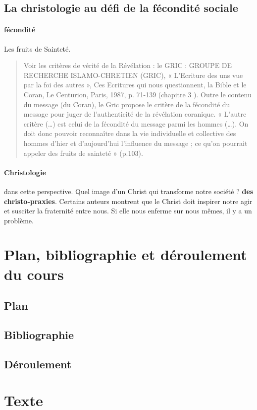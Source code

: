 \subsection{La christologie au défi de la fécondité sociale} 


\paragraph{fécondité} Les fruits de Sainteté. 
\begin{quote}
    Voir les critères de vérité de la Révélation : le GRIC : GROUPE DE RECHERCHE
ISLAMO-CHRETIEN (GRIC), « L’Ecriture des uns vue par la foi des autres », Ces Ecritures
qui nous questionnent, la Bible et le Coran, Le Centurion, Paris, 1987, p. 71-139 (chapitre 3 ).
Outre le contenu du message (du Coran), le Gric propose le critère de la fécondité du message
pour juger de l’authenticité de la révélation coranique. « L’autre critère (…) est celui de la
fécondité du message parmi les hommes (…). On doit donc pouvoir reconnaître dans la vie
individuelle et collective des hommes d’hier et d’aujourd’hui l’influence du message ; ce
qu’on pourrait appeler des fruits de sainteté » (p.103).
\end{quote}

\paragraph{Christologie} dans cette perspective. Quel image d'un Christ qui transforme notre société ? \textbf{des christo-praxies}. Certains auteurs montrent que le Christ doit inspirer notre agir et susciter la fraternité entre nous. Si elle nous enferme sur nous mêmes, il y a un problème.


\section{Plan, bibliographie et déroulement du cours}
\subsection{Plan}
 
\subsection{Bibliographie}
 
\subsection{Déroulement}


 \section{Texte}











 

